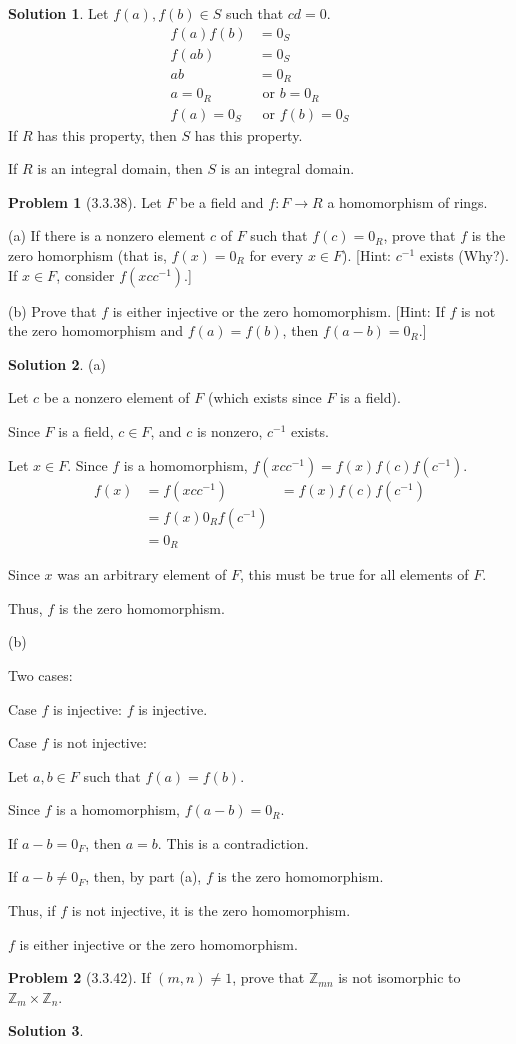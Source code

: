 \documentclass[12pt]{article}
\theoremstyle{definition}
\newtheorem*{prob}{Problem}
\newtheorem*{soln}{Solution}
\newcommand{\ZZ}{{\mathbb{Z}}}
\begin{document}
\begin{soln}
Let $f(a),f(b)\in S$ such that $cd=0$.
\begin{align*}
f(a)f(b)&=0_S\\
f(ab)&=0_S\\
ab&=0_R\\
a=0_R&\text{ or }b=0_R\\
f(a)=0_S&\text{ or }f(b)=0_S
\end{align*}
If $R$ has this property, then $S$ has this property.

If $R$ is an integral domain, then $S$ is an integral domain.

\end{soln}

\begin{prob}[3.3.38]
Let $F$ be a field and $f:F \to R$ a homomorphism of  rings.     

(a)   If there is a nonzero element $c$ of  $F$ such that $f(c) = 0_R$, 
prove that $f$ is the zero homorphism (that is, $f(x) = 0_R$ for every $x\in F$). 
[Hint: $c^{-1}$ exists (Why?). If  $x\in F$, consider $f(xcc^{-1})$.]     

(b)   Prove that $f$ is either injective or the zero homomorphism. 
[Hint: If  $f$ is not the zero homomorphism and $f(a) = f(b)$, then $f(a - b) = 0_R$.]
\end{prob}

\begin{soln}\quad

(a)

Let $c$ be a nonzero element of $F$ (which exists since $F$ is a field).

Since $F$ is a field, $c\in F$, and $c$ is nonzero, $c^{-1}$ exists.

Let $x\in F$.  Since $f$ is a homomorphism, $f(xcc^{-1})=f(x)f(c)f(c^{-1})$.
\begin{align*}
f(x)&=f(xcc^{-1})
&=f(x)f(c)f(c^{-1})\\
&=f(x)0_Rf(c^{-1})\\
&=0_R
\end{align*}

Since $x$ was an arbitrary element of $F$,
this must be true for all elements of $F$.

Thus, $f$ is the zero homomorphism.

(b)

Two cases:

Case $f$ is injective: $f$ is injective.

Case $f$ is not injective:

Let $a,b\in F$ such that $f(a)=f(b)$.

Since $f$ is a homomorphism, $f(a-b)=0_R$.

If $a-b=0_F$, then $a=b$.  This is a contradiction.

If $a-b\neq 0_F$, then, by part (a), $f$ is the zero homomorphism.

Thus, if $f$ is not injective, it is the zero homomorphism.

$f$ is either injective or the zero homomorphism.

\end{soln}


\begin{prob}[3.3.42]
If  $(m, n) \neq 1$, prove that $\ZZ_{mn}$ is not isomorphic to $\ZZ_m \times \ZZ_n$.
\end{prob}

\begin{soln}

\end{soln}
\end{document}
